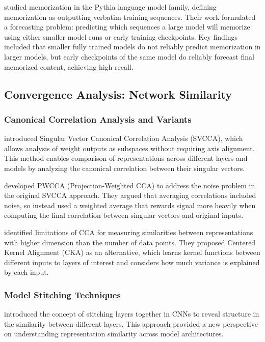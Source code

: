 \citet{biderman2023emergent} studied memorization in the Pythia language model family, defining memorization as outputting verbatim training sequences. Their work formulated a forecasting problem: predicting which sequences a large model will memorize using either smaller model runs or early training checkpoints. Key findings included that smaller fully trained models do not reliably predict memorization in larger models, but early checkpoints of the same model do reliably forecast final memorized content, achieving high recall.

\subsection{Convergence Analysis: Network Similarity}

\subsubsection{Canonical Correlation Analysis and Variants}

\citet{raghu2017svcca} introduced Singular Vector Canonical Correlation Analysis (SVCCA), which allows analysis of weight outputs as subspaces without requiring axis alignment. This method enables comparison of representations across different layers and models by analyzing the canonical correlation between their singular vectors.

\citet{morcos2018pwcca} developed PWCCA (Projection-Weighted CCA) to address the noise problem in the original SVCCA approach. They argued that averaging correlations included noise, so instead used a weighted average that rewards signal more heavily when computing the final correlation between singular vectors and original inputs.

\citet{kornblith2019cka} identified limitations of CCA for measuring similarities between representations with higher dimension than the number of data points. They proposed Centered Kernel Alignment (CKA) as an alternative, which learns kernel functions between different inputs to layers of interest and considers how much variance is explained by each input.

\subsubsection{Model Stitching Techniques}

\citet{lenc2015understanding} introduced the concept of stitching layers together in CNNs to reveal structure in the similarity between different layers. This approach provided a new perspective on understanding representation similarity across model architectures.

